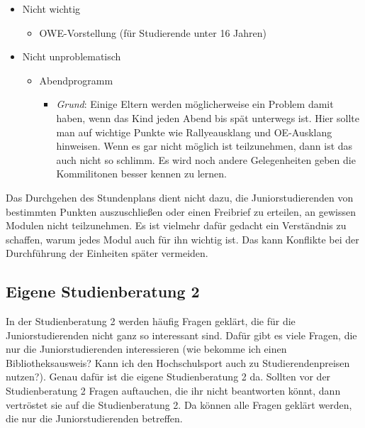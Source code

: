 \documentclass[a4paper,11pt]{scrartcl} %
\newenvironment{myitemize}{\begin{itemize}\itemsep -2pt}{\end{itemize}} %
\begin{document}
\begin{myitemize}
\begin{myitemize}
			\item Studienberatung 3 -- kann aber durchaus als Überbrückung bis zum Ausklang am Freitag genutzt werden
		\end{myitemize}
	\newpage
	\item Nicht wichtig
		\begin{myitemize}
			\item OWE-Vorstellung (für Studierende unter 16 Jahren)
		\end{myitemize}
	\item Nicht unproblematisch
		\begin{myitemize}
			\item Abendprogramm
				\begin{myitemize}
					\item \textit{Grund}: Einige Eltern werden möglicherweise ein Problem damit haben, wenn das Kind jeden Abend bis spät unterwegs ist. Hier sollte man auf wichtige Punkte wie Rallyeausklang und OE-Ausklang hinweisen. Wenn es gar nicht möglich ist teilzunehmen, dann ist das auch nicht so schlimm. Es wird noch andere Gelegenheiten geben die Kommilitonen besser kennen zu lernen.
				\end{myitemize}
		\end{myitemize}		
\end{myitemize}

Das Durchgehen des Stundenplans dient nicht dazu, die Juniorstudierenden von bestimmten Punkten auszuschließen oder einen Freibrief zu erteilen, an gewissen Modulen nicht teilzunehmen. Es ist vielmehr dafür gedacht ein Verständnis zu schaffen, warum jedes Modul auch für ihn wichtig ist. Das kann Konflikte bei der Durchführung der Einheiten später vermeiden.

	\subsection{Eigene Studienberatung 2}
	
In der Studienberatung 2 werden häufig Fragen geklärt, die für die Juniorstudierenden nicht ganz so interessant sind. Dafür gibt es viele Fragen, die nur die Juniorstudierenden interessieren (wie bekomme ich einen Bibliotheksausweis? Kann ich den Hochschulsport auch zu Studierendenpreisen nutzen?). Genau dafür ist die eigene Studienberatung 2 da. Sollten vor der Studienberatung 2 Fragen auftauchen, die ihr nicht beantworten könnt, dann vertröstet sie auf die Studienberatung 2. Da können alle Fragen geklärt werden, die nur die Juniorstudierenden betreffen.	
\end{document}
